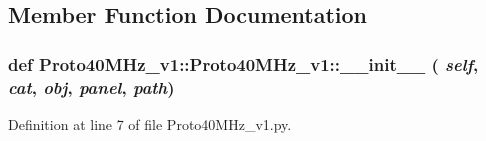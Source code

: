 \subsection{Member Function Documentation}
\hypertarget{classProto40MHz__v1_1_1Proto40MHz__v1_a14f512fbb4278e3d52edb203544153c2}{
\subsubsection[{\_\-\_\-init\_\-\_\-}]{\setlength{\rightskip}{0pt plus 5cm}def Proto40MHz\_\-v1::Proto40MHz\_\-v1::\_\-\_\-init\_\-\_\- ( {\em self}, \/   {\em cat}, \/   {\em obj}, \/   {\em panel}, \/   {\em path})}}
\label{classProto40MHz__v1_1_1Proto40MHz__v1_a14f512fbb4278e3d52edb203544153c2}


Definition at line 7 of file Proto40MHz\_\-v1.py.


